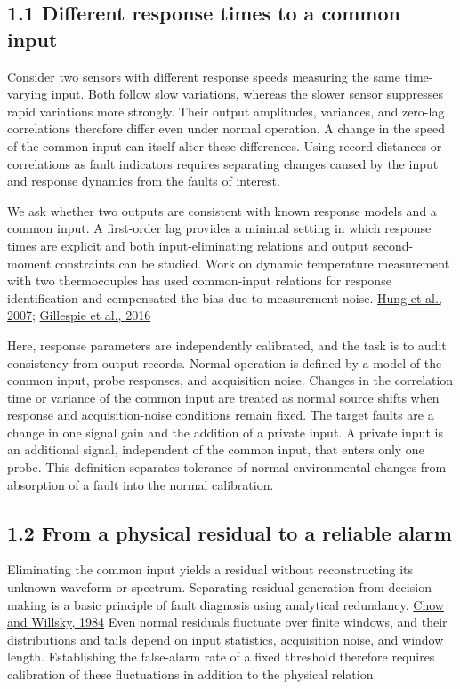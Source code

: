 \documentclass[10pt,a4paper]{article}
\begin{document}
\subsection{1.1 Different response times to a common input}

Consider two sensors with different response speeds measuring the same time-varying input. Both follow slow variations, whereas the slower sensor suppresses rapid variations more strongly. Their output amplitudes, variances, and zero-lag correlations therefore differ even under normal operation. A change in the speed of the common input can itself alter these differences. Using record distances or correlations as fault indicators requires separating changes caused by the input and response dynamics from the faults of interest.

We ask whether two outputs are consistent with known response models and a common input. A first-order lag provides a minimal setting in which response times are explicit and both input-eliminating relations and output second-moment constraints can be studied. Work on dynamic temperature measurement with two thermocouples has used common-input relations for response identification and compensated the bias due to measurement noise. \href{https://doi.org/10.1115/1.2431814}{Hung et al., 2007}; \href{https://doi.org/10.1016/j.ifacol.2016.07.087}{Gillespie et al., 2016}

Here, response parameters are independently calibrated, and the task is to audit consistency from output records. Normal operation is defined by a model of the common input, probe responses, and acquisition noise. Changes in the correlation time or variance of the common input are treated as normal source shifts when response and acquisition-noise conditions remain fixed. The target faults are a change in one signal gain and the addition of a private input. A private input is an additional signal, independent of the common input, that enters only one probe. This definition separates tolerance of normal environmental changes from absorption of a fault into the normal calibration.

\subsection{1.2 From a physical residual to a reliable alarm}

Eliminating the common input yields a residual without reconstructing its unknown waveform or spectrum. Separating residual generation from decision-making is a basic principle of fault diagnosis using analytical redundancy. \href{https://doi.org/10.1109/TAC.1984.1103593}{Chow and Willsky, 1984} Even normal residuals fluctuate over finite windows, and their distributions and tails depend on input statistics, acquisition noise, and window length. Establishing the false-alarm rate of a fixed threshold therefore requires calibration of these fluctuations in addition to the physical relation.
\end{document}
